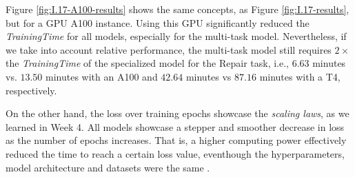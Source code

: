 \documentclass{article}
\begin{document}
Figure \ref{fig:I.17-A100-results} shows the same concepts, as Figure \ref{fig:I.17-results}, but for a GPU A100 instance. Using this GPU significantly reduced the \emph{TrainingTime} for all models, especially for the multi-task model. Nevertheless, if we take into account relative performance, the multi-task model still requires $2\times$ the \emph{TrainingTime} of the specialized model for the Repair task, i.e., $6.63$ minutes vs. $13.50$ minutes with an A100 and $42.64$ minutes vs $87.16$ minutes with a T4, respectively.

On the other hand, the loss over training epochs showcase the \emph{scaling laws}, as we learned in Week 4. All models showcase a stepper and smoother decrease in loss as the number of epochs increases. That is, a higher computing power effectively reduced the time to reach a certain loss value, eventhough the hyperparameters, model architecture and datasets were the same \cite{scalinglaws2020}.
\end{document}
